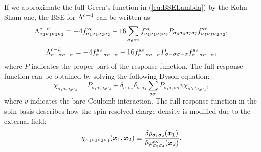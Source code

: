 %
%
%
If we approximate the full Green's function in (\ref{eq:BSELambda}) by the Kohn-Sham one, 
the BSE for $\Lambda^{\rm c - \rm d}$ can be written as
\begin{equation}
	\Lambda^{\rm c - \rm d}_{\sigma_1\sigma_1\sigma_2\sigma_2} = -4f^{\rm xc}_{\sigma_1\sigma_1\sigma_2\sigma_2} 
	- 16 \sum_{\sigma_6\sigma_7}f^{\rm xc }_{\sigma_1\sigma_1\sigma_6\sigma_6}
	P_{\sigma_6\sigma_6\sigma_7\sigma_7}f^{\rm xc}_{\sigma_7\sigma_7\sigma_2\sigma_2},
	\label{eq:longlambda}
\end{equation}
%
\begin{equation}
	\Lambda^{\rm c - \rm d}_{\sigma-\sigma\sigma-\sigma} = -4f^{\rm xc}_{\sigma-\sigma\sigma-\sigma} 
	- 16 f^{\rm xc }_{\sigma-\sigma\sigma-\sigma}
	P_{\sigma-\sigma\sigma-\sigma}f^{\rm xc}_{\sigma-\sigma\sigma-\sigma},
	\label{eq:translambda}
\end{equation}
%
where $P$ indicates the proper part of the response function. The full response function can be obtained
by solving the following Dyson equation:
%
\begin{equation}
	\chi_{\sigma_1\sigma_2\sigma_3\sigma_4} = P_{\sigma_1\sigma_2\sigma_3\sigma_4}
	+ \delta_{\sigma_1\sigma_2}\delta_{\sigma_3\sigma_4} \sum_{\sigma\sigma'}
	P_{\sigma_1\sigma_2\sigma\sigma}v\chi_{\sigma'\sigma'\sigma_3\sigma_4},
	\label{eq:chiDyson}
\end{equation}
%
where $v$ indicates the bare Coulomb interaction.
The full response function in the spin basis describes how the spin-resolved charge density is modified
due to the external field:
%
\begin{equation}
	\chi_{\sigma_1\sigma_2\sigma_3\sigma_4}(\bm x_1,\bm x_2) \equiv
	\frac{\delta\rho_{\sigma_1\sigma_2}(\bm x_1)}{\delta\varphi^{\rm ext}_{\sigma_3\sigma_4}(\bm x_2)}.
	\label{eq:spinchi}
\end{equation}
